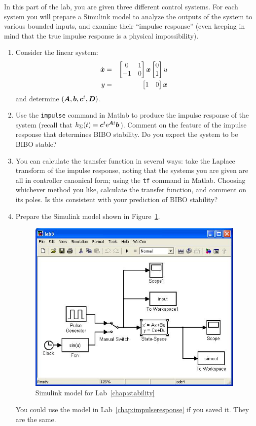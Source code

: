In this part of the lab, you are given three different control systems.  For
each system you will prepare a \textsf{Simulink} model to analyze the outputs
of the system to various bounded inputs, and examine their ``impulse
response'' (even keeping in mind that the true impulse response is a physical
impossibility).
\begin{enumerate}
\item Consider the linear system:
\begin{eqnarray*}
\dot{\boldsymbol{x}}&=&\begin{bmatrix}0&1\\-1&0\\\end{bmatrix}\boldsymbol{x}
\begin{bmatrix}0\\1\end{bmatrix}u\\
y&=&\begin{bmatrix}1&0\end{bmatrix}\boldsymbol{x}
\end{eqnarray*}
and determine $(\boldsymbol{A},\boldsymbol{b},\boldsymbol{c}^{t},\boldsymbol{D})$\@.

\item Use the \verb|impulse| command in \textsf{Matlab} to produce the
impulse response of the system (recall that
$h_{\Sigma}(t)=\boldsymbol{c}^{t}\textup{e}^{\boldsymbol{A}t}\boldsymbol{b}$). Comment on the feature
of the impulse response that determines BIBO stability. Do you expect the
system to be BIBO stable?

\item You can calculate the transfer function in several ways: take the
Laplace transform of the impulse response, noting that the systems you are
given are all in controller canonical form; using the \verb|tf| command in
\textsf{Matlab}\@.  Choosing whichever method you like, calculate the
transfer function, and comment on its poles. Is this consistent with your
prediction of BIBO stability?

\item Prepare the \textsf{Simulink} model shown in Figure~\ref{fig:model5}\@.
\begin{figure}[htbp]
\centering
\includegraphics[width=0.6\hsize]{pix/model5.jpg}
\caption{\textsf{Simulink} model for Lab~\ref{chap:stability}}        \label{fig:model5}
\end{figure}%
You could use the model in Lab~\ref{chap:impulseresponse} if you saved it.
They are the same.


\end{enumerate}
